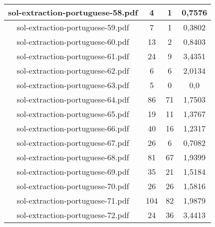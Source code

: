 \documentclass[11pt]{article}
\newlength\mylength
\begin{document}
\begin{center}
\begin{longtable}{||C{.40\mylength}||C{.30\mylength}||C{.30\mylength}||C{.30\mylength}||}
  sol-extraction-portuguese-58.pdf & 4 & 1 & 0,7576 \\  \hline
  sol-extraction-portuguese-59.pdf & 7 & 1 & 0,3802 \\  \hline
  sol-extraction-portuguese-60.pdf & 13 & 2 & 0,8403 \\  \hline
  sol-extraction-portuguese-61.pdf & 24 & 9 & 3,4351 \\  \hline
  sol-extraction-portuguese-62.pdf & 6 & 6 & 2,0134 \\  \hline
  sol-extraction-portuguese-63.pdf & 5 & 0 & 0,0 \\  \hline
  sol-extraction-portuguese-64.pdf & 86 & 71 & 1,7503 \\  \hline
  sol-extraction-portuguese-65.pdf & 19 & 11 & 1,3767 \\  \hline
  sol-extraction-portuguese-66.pdf & 40 & 16 & 1,2317 \\  \hline
  sol-extraction-portuguese-67.pdf & 26 & 6 & 0,7082 \\  \hline
  sol-extraction-portuguese-68.pdf & 81 & 67 & 1,9399 \\  \hline
  sol-extraction-portuguese-69.pdf & 35 & 21 & 1,5184 \\  \hline
  sol-extraction-portuguese-70.pdf & 26 & 26 & 1,5816 \\  \hline
  sol-extraction-portuguese-71.pdf & 104 & 82 & 1,9879 \\  \hline
  sol-extraction-portuguese-72.pdf & 24 & 36 & 3,4413 \\  \hline

\end{longtable}
\end{center}
\end{document}

